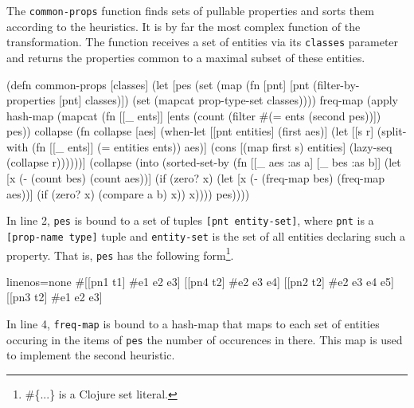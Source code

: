 \documentclass[submission]{eptcs}
\begin{document}
The \verb|common-props| function finds sets of pullable properties and sorts
them according to the heuristics.  It is by far the most complex function of
the transformation.  The function receives a set of entities via its
\verb|classes| parameter and returns the properties common to a maximal subset
of these entities.
\begin{clojurecode}
(defn common-props [classes]
  (let [pes (set (map (fn [pnt] [pnt (filter-by-properties [pnt] classes)])
                      (set (mapcat prop-type-set classes))))
        freq-map (apply hash-map
                        (mapcat (fn [[_ ents]] [ents (count (filter #(= ents (second %
                                                                    pes))])
                                pes))
        collapse (fn collapse [aes]
                   (when-let [[pnt entities] (first aes)]
                     (let [[s r] (split-with (fn [[_ ents]] (= entities ents)) aes)]
                       (cons [(map first s) entities]
                             (lazy-seq (collapse r))))))]
    (collapse (into (sorted-set-by
                     (fn [[_ aes :as a] [_ bes :as b]]
                       (let [x (- (count bes) (count aes))]
                         (if (zero? x)
                           (let [x (- (freq-map bes) (freq-map aes))]
                             (if (zero? x) (compare a b) x))
                           x))))
                    pes))))
\end{clojurecode}
In line 2, \verb|pes| is bound to a set of tuples \verb|[pnt entity-set]|,
where \verb|pnt| is a \verb|[prop-name type]| tuple and \verb|entity-set| is
the set of all entities declaring such a property.  That is, \verb|pes| has the
following form\footnote{\textsf{\#\{...\} is a Clojure set literal.}}.
\begin{clojurecode*}{linenos=none}
#{[[pn1 t1] #{e1 e2 e3}]     [[pn4 t2] #{e2 e3 e4}]
  [[pn2 t2] #{e2 e3 e4 e5}]  [[pn3 t2] #{e1 e2 e3}]}
\end{clojurecode*}
In line 4, \verb|freq-map| is bound to a hash-map that maps to each set of
entities occuring in the items of \verb|pes| the number of occurences in there.
This map is used to implement the second heuristic.
\end{document}
